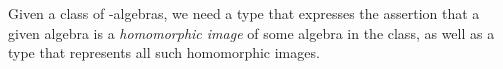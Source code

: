 Given a class  of -algebras, we need a type that expresses the assertion that a given algebra is a \emph{homomorphic image} of some algebra in the class, as well as a type that represents all such homomorphic images.
\ccpad
\begin{code}%
\>[0]\AgdaSpace{}%
\AgdaModule{\AgdaUnderscore{}}\AgdaSpace{}%
\AgdaSymbol{\{}\AgdaSpace{}%
\AgdaSymbol{:}\AgdaSpace{}%
\AgdaSymbol{\}}\AgdaSpace{}%
\<%
\\
%
\\[\AgdaEmptyExtraSkip]%
\>[0][@{}l@{\AgdaIndent{0}}]%
\>[1]\AgdaSpace{}%
\AgdaSymbol{:}\AgdaSpace{}%
\AgdaSpace{}%
\AgdaSpace{}%
\AgdaSpace{}%
\AgdaSpace{}%
\AgdaSpace{}%
\AgdaSymbol{(}\AgdaSpace{}%
\AgdaSpace{}%
\AgdaSymbol{)(}\AgdaSpace{}%
\AgdaSymbol{)}\AgdaSpace{}%
\AgdaSpace{}%
\AgdaSpace{}%
\AgdaSpace{}%
\AgdaSpace{}%
\AgdaSpace{}%
\AgdaSpace{}%
\AgdaSpace{}%
\<%
\\
%
\>[1]\AgdaSpace{}%
\AgdaSpace{}%
\AgdaSpace{}%
\AgdaSymbol{=}\AgdaSpace{}%
\AgdaSpace{}%
\AgdaSpace{}%
\AgdaSpace{}%
\AgdaSymbol{(}\AgdaSpace{}%
\AgdaSpace{}%
\AgdaSymbol{)}\AgdaSpace{}%
\AgdaFunction{,}\AgdaSpace{}%
\AgdaSymbol{(}\AgdaSpace{}%
\AgdaSpace{}%
\AgdaSymbol{)}\AgdaSpace{}%
\AgdaSpace{}%
\AgdaSymbol{(}\AgdaSpace{}%
\AgdaSpace{}%
\AgdaSymbol{)}\<%
\\
%
\\[\AgdaEmptyExtraSkip]%
%
\>[1]\AgdaSpace{}%
\AgdaSymbol{:}\AgdaSpace{}%
\AgdaSpace{}%
\AgdaSymbol{(}\AgdaSpace{}%
\AgdaSpace{}%
\AgdaSymbol{)}\AgdaSpace{}%
\AgdaSymbol{(}\AgdaSpace{}%
\AgdaSymbol{)}\AgdaSpace{}%
\AgdaSpace{}%

\end{code}
